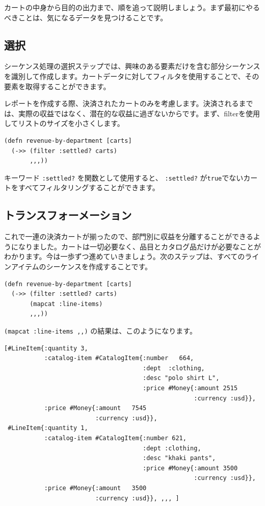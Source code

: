 カートの中身から目的の出力まで、順を追って説明しましょう。まず最初にやるべきことは、気になるデータを見つけることです。

\subsection{選択}

シーケンス処理の選択ステップでは、興味のある要素だけを含む部分シーケンスを識別して作成します。カートデータに対してフィルタを使用することで、その要素を取得することができます。

レポートを作成する際、決済されたカートのみを考慮します。決済されるまでは、実際の収益ではなく、潜在的な収益に過ぎないからです。まず、filterを使用してリストのサイズを小さくします。



\begin{lstlisting}[numbers=none]
(defn revenue-by-department [carts]
  (->> (filter :settled? carts)
       ,,,))
\end{lstlisting}

キーワード \texttt{:settled?} を関数として使用すると、 \texttt{:settled?} が\texttt{true}でないカートをすべてフィルタリングすることができます。

\subsection{トランスフォーメーション}

これで一連の決済カートが揃ったので、部門別に収益を分離することができるようになりました。カートは一切必要なく、品目とカタログ品だけが必要なことがわかります。今は一歩ずつ進めていきましょう。次のステップは、すべてのラインアイテムのシーケンスを作成することです。


\begin{lstlisting}[numbers=none]
(defn revenue-by-department [carts]
  (->> (filter :settled? carts)
       (mapcat :line-items)
       ,,,))
\end{lstlisting}

\texttt{(mapcat :line-items ,,)} の結果は、このようになります。


\begin{lstlisting}[numbers=none]
[#LineItem{:quantity 3,
           :catalog-item #CatalogItem{:number   664,
                                      :dept  :clothing,
                                      :desc "polo shirt L",
                                      :price #Money{:amount 2515
                                                    :currency :usd}},
           :price #Money{:amount   7545
                         :currency :usd}},
 #LineItem{:quantity 1,
           :catalog-item #CatalogItem{:number 621,
                                      :dept :clothing,
                                      :desc "khaki pants",
                                      :price #Money{:amount 3500
                                                    :currency :usd}},
           :price #Money{:amount   3500
                         :currency :usd}}, ,,, ]
\end{lstlisting}

